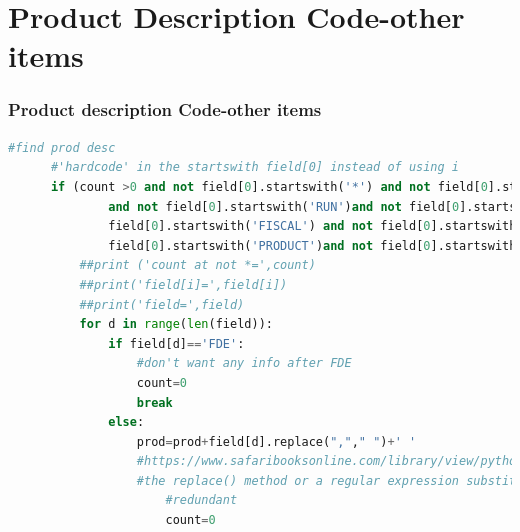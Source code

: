 \documentclass{beamer}\usepackage[]{graphicx}\usepackage[]{color}
\begin{document}
\section{Product Description Code-other items}
\begin{frame}[fragile]
  \frametitle{Product description Code-other items}

\begin{lstlisting}[language=Python]
          #find prod desc
      #'hardcode' in the startswith field[0] instead of using i
      if (count >0 and not field[0].startswith('*') and not field[0].startswith('DCM')
              and not field[0].startswith('RUN')and not field[0].startswith('BILL') and not
              field[0].startswith('FISCAL') and not field[0].startswith('DEPT:') and not
              field[0].startswith('PRODUCT')and not field[0].startswith('-------')):
          ##print ('count at not *=',count)
          ##print('field[i]=',field[i])
          ##print('field=',field)
          for d in range(len(field)):
              if field[d]=='FDE':
                  #don't want any info after FDE
                  count=0
                  break
              else:
                  prod=prod+field[d].replace(","," ")+' '
                  #https://www.safaribooksonline.com/library/view/python-cookbook-3rd/9781449357337/ch02s11.html
                  #the replace() method or a regular expression substitution.
                      #redundant
                      count=0

\end{lstlisting}

\end{frame}
\end{document}
